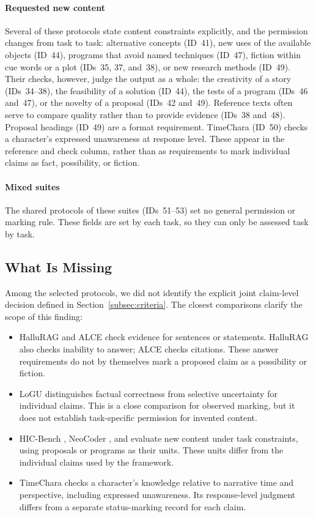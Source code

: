 \documentclass{clv2025}
\begin{document}
\paragraph{Requested new content}
Several of these protocols state content constraints explicitly, and the permission changes
from task to task: alternative concepts (ID~41), new uses of the available
objects (ID~44), programs that avoid named techniques (ID~47), fiction
within cue words or a plot (IDs~35, 37, and~38), or new research methods
(ID~49). Their checks, however, judge the output as a whole: the
creativity of a story (IDs~34--38), the feasibility of a solution
(ID~44), the tests of a program (IDs~46 and~47), or the novelty of a
proposal (IDs~42 and~49). Reference texts often serve to
compare quality rather than to provide evidence (IDs~38 and~48).
Proposal headings (ID~49) are a format requirement. TimeChara (ID~50)
checks a character's expressed unawareness at response level. These appear
in the reference and check column, rather than as requirements to mark
individual claims as fact, possibility, or fiction.

\paragraph{Mixed suites}
The shared protocols of these suites (IDs~51--53) set no general permission or marking
rule. These fields are set by each task, so they can only be assessed task
by task.

\subsection{What Is Missing}\label{subsec:gap}

Among the selected protocols, we did not identify the explicit joint
claim-level decision defined in Section~\ref{subsec:criteria}. The closest
comparisons clarify the scope of this finding:
\begin{itemize}
\item HalluRAG \citep{ridder_hallurag_2025} and ALCE \citep{gao_alce_2023}
check evidence for sentences or statements.
HalluRAG also checks inability to answer; ALCE checks citations. These
answer requirements do not by themselves mark a proposed claim as a
possibility or fiction.
\item LoGU \citep{yang_logu_2025} distinguishes factual correctness from
selective uncertainty for individual claims. This is a close comparison for observed marking,
but it does not establish task-specific permission for invented content.
\item HIC-Bench \citep{yang_hicbench_2025}, NeoCoder
\citep{lu_benchmarking_2025}, and \citet{si_ideas_2025} evaluate new content
under task constraints, using proposals or programs as their units.
These units differ from the individual claims used by the framework.
\item TimeChara \citep{ahn_timechara_2024} checks a character's knowledge
relative to narrative time
and perspective, including expressed unawareness. Its response-level
judgment differs from a separate status-marking record for each claim.
\end{itemize}
\end{document}
